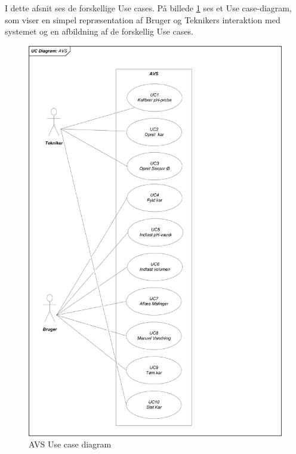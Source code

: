 I dette afsnit ses de forskellige Use cases. På billede \ref{photo:UseCD} ses et Use case-diagram, som viser en simpel repræsentation af Bruger og Teknikers interaktion med systemet og en afbildning af de forskellig Use cases. 
\newline
\begin{figure}[H]
	\centering
	\includegraphics[scale=0.6]{Kravspecifikation/UseCases/Photo/AVS_UseCases}
	\caption{AVS Use case diagram}
	\label{photo:UseCD}
\end{figure}

\newpage